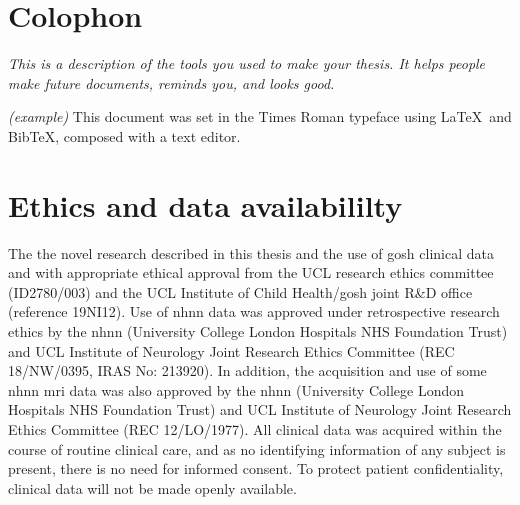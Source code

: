 \chapter{Colophon}
\label{appendixlabel3}
\textit{This is a description of the tools you used to make your thesis. It helps people make future documents, reminds you, and looks good.}

\textit{(example)} This document was set in the Times Roman typeface using \LaTeX\ and Bib\TeX , composed with a text editor.


\chapter{Ethics and data availabililty}

The the novel research described in this thesis and the use of \gls{gosh} clinical data and with appropriate ethical approval from the UCL research ethics committee (ID2780/003) and the UCL Institute of Child Health/\gls{gosh} joint R\&D office (reference 19NI12).
Use of \gls{nhnn} data was approved under retrospective research ethics by the \gls{nhnn} (University College London Hospitals NHS Foundation Trust) and UCL Institute of Neurology Joint Research Ethics Committee (REC 18/NW/0395, IRAS No: 213920).
In addition, the acquisition and use of some \gls{nhnn} \gls{mri} data was also approved by the \gls{nhnn} (University College London Hospitals NHS Foundation Trust) and UCL Institute of Neurology Joint Research Ethics Committee (REC 12/LO/1977).
All clinical data was acquired within the course of routine clinical care, and as no identifying information of any subject is present, there is no need for informed consent.
To protect patient confidentiality, clinical data will not be made openly available.
